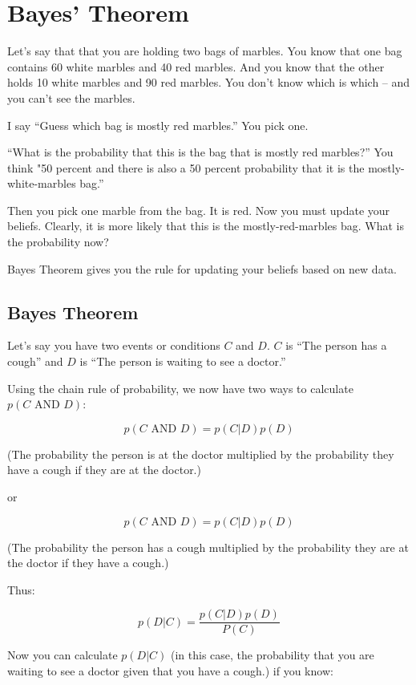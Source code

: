 \chapter{Bayes' Theorem}

Let's say that that you are holding two bags of marbles.
You know that one bag contains 60 white marbles and 40 red marbles. And you
know that the other holds 10 white marbles and 90 red marbles. You
don't know which is which -- and you can't see the marbles.

I say ``Guess which bag is mostly red marbles.'' You pick one.

``What is the probability that this is the bag that is mostly red marbles?''
 You think "50 percent and there is
also a 50 percent probability that it is the mostly-white-marbles bag.''

Then you pick one marble from the bag. It is red. Now you must
update your beliefs. Clearly, it is more likely that this is the
mostly-red-marbles bag. What is the probability now?

Bayes Theorem gives you the rule for updating your beliefs based on
new data.

\section{Bayes Theorem}

Let's say you have two events or conditions $C$ and $D$. $C$ is
``The person has a cough'' and $D$ is ``The person is waiting to see a doctor.''

Using the chain rule of probability, we now have two ways to calculate $p(C \text{ AND } D)$:

$$p(C \text{ AND } D) = p(C | D) p(D)$$

(The probability the person is at the doctor multiplied by the probability they have a cough if they are at the doctor.)

or 

$$p(C \text{ AND } D) = p(C | D) p(D)$$

(The probability the person has a cough multiplied by the probability they are at the doctor if they have a cough.)

Thus:

$$p(D | C) = \frac {p(C | D)p(D)}{P(C)}$$

Now you can calculate $p(D | C)$ (in this case, the probability that
you are waiting to see a doctor given that you have a cough.) if you
know:

